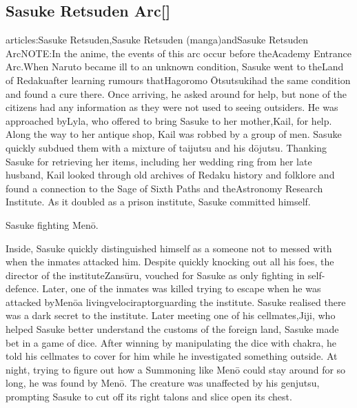 \documentclass[a4paper,12pt]{article}
\begin{document}
\subsection*{Sasuke Retsuden Arc[]}\n\nMain articles:Sasuke Retsuden,Sasuke Retsuden (manga)andSasuke Retsuden ArcNOTE:In the anime, the events of this arc occur before theAcademy Entrance Arc.When Naruto became ill to an unknown condition, Sasuke went to theLand of Redakuafter learning rumours thatHagoromo Ōtsutsukihad the same condition and found a cure there. Once arriving, he asked around for help, but none of the citizens had any information as they were not used to seeing outsiders. He was approached byLyla, who offered to bring Sasuke to her mother,Kail, for help. Along the way to her antique shop, Kail was robbed by a group of men. Sasuke quickly subdued them with a mixture of taijutsu and his dōjutsu. Thanking Sasuke for retrieving her items, including her wedding ring from her late husband, Kail looked through old archives of Redaku history and folklore and found a connection to the Sage of Sixth Paths and theAstronomy Research Institute. As it doubled as a prison institute, Sasuke committed himself.\\ \par \vspace{0.5cm}

Sasuke fighting Menō.\\ \par \vspace{0.5cm}

Inside, Sasuke quickly distinguished himself as a someone not to messed with when the inmates attacked him. Despite quickly knocking out all his foes, the director of the instituteZansūru, vouched for Sasuke as only fighting in self-defence. Later, one of the inmates was killed trying to escape when he was attacked byMenōa livingvelociraptorguarding the institute. Sasuke realised there was a dark secret to the institute. Later meeting one of his cellmates,Jiji, who helped Sasuke better understand the customs of the foreign land, Sasuke made bet in a game of dice. After winning by manipulating the dice with chakra, he told his cellmates to cover for him while he investigated something outside. At night, trying to figure out how a Summoning like Menō could stay around for so long, he was found by Menō. The creature was unaffected by his genjutsu, prompting Sasuke to cut off its right talons and slice open its chest.\\ \par \vspace{0.5cm}
\end{document}
